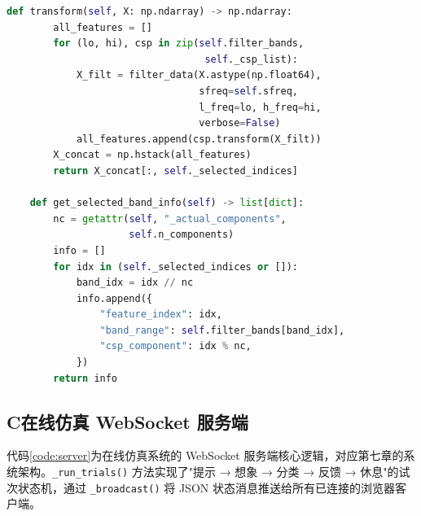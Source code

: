 \begin{lstlisting}[language=Python, caption={FBCSP 特征提取器 \texttt{src/features/fbcsp.py}\label{code:fbcsp}}]
    def transform(self, X: np.ndarray) -> np.ndarray:
        all_features = []
        for (lo, hi), csp in zip(self.filter_bands,
                                  self._csp_list):
            X_filt = filter_data(X.astype(np.float64),
                                 sfreq=self.sfreq,
                                 l_freq=lo, h_freq=hi,
                                 verbose=False)
            all_features.append(csp.transform(X_filt))
        X_concat = np.hstack(all_features)
        return X_concat[:, self._selected_indices]

    def get_selected_band_info(self) -> list[dict]:
        nc = getattr(self, "_actual_components",
                     self.n_components)
        info = []
        for idx in (self._selected_indices or []):
            band_idx = idx // nc
            info.append({
                "feature_index": idx,
                "band_range": self.filter_bands[band_idx],
                "csp_component": idx % nc,
            })
        return info
\end{lstlisting}

\subsection*{C\quad 在线仿真 WebSocket 服务端}

代码\ref{code:server}为在线仿真系统的 WebSocket 服务端核心逻辑，对应第七章的系统架构。\texttt{\_run\_trials()} 方法实现了"提示 → 想象 → 分类 → 反馈 → 休息"的试次状态机，通过 \texttt{\_broadcast()} 将 JSON 状态消息推送给所有已连接的浏览器客户端。


